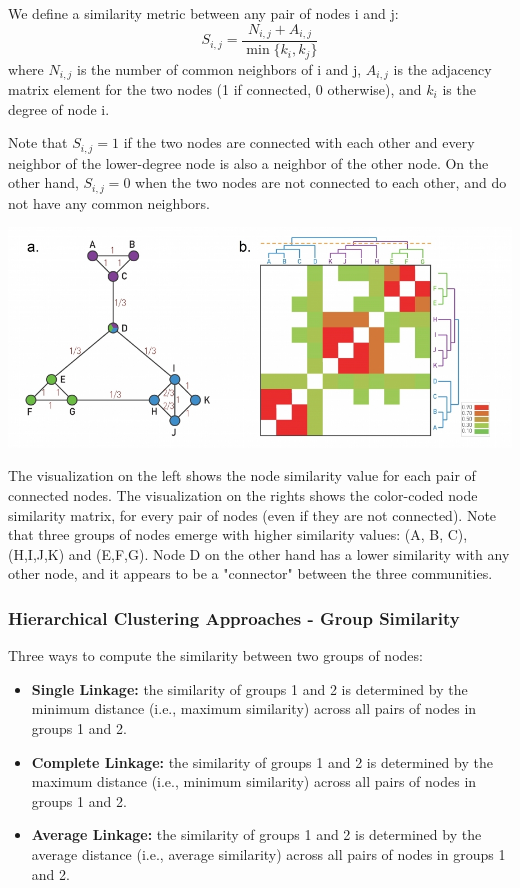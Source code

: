 \documentclass[11pt]{scrartcl} %
\begin{document}
We define a similarity metric between any pair of nodes i and j:
\[ S_{i,j} = \frac{N_{i,j} + A_{i,j}}{\min\{k_i, k_j\}} \]
where $N_{i,j}$ is the number of common neighbors of i and j, $A_{i,j}$ is the adjacency matrix element for the two nodes (1 if connected, 0 otherwise), and $k_i$ is the degree of node i.

Note that $S_{i,j} = 1$ if the two nodes are connected with each other and every neighbor of the lower-degree node is also a neighbor of the other node.  On the other hand, $S_{i,j} = 0$ when the two nodes are not connected to each other, and do not have any common neighbors.

\includegraphics[width=0.9\linewidth]{img/L7.2-AgglomerativeHierarchicalCommunityDetection.jpg}

The visualization on the left shows the node similarity value for each pair of connected nodes. The visualization on the rights shows the color-coded node similarity matrix, for every pair of nodes (even if they are not connected). Note that three groups of nodes emerge with higher similarity values: (A, B, C), (H,I,J,K) and (E,F,G). Node D on the other hand has a lower similarity with any other node, and it appears to be a "connector" between the three communities.

\subsubsection{Hierarchical Clustering Approaches - Group Similarity}
Three ways to compute the similarity between two groups of nodes:
\begin{itemize}
	\item \textbf{Single Linkage:} the similarity of groups 1 and 2 is determined by the minimum distance (i.e., maximum similarity) across all pairs of nodes in groups 1 and 2.  
	\item \textbf{Complete Linkage:} the similarity of groups 1 and 2 is determined by the maximum distance (i.e., minimum similarity) across all pairs of nodes in groups 1 and 2. 
	\item \textbf{Average Linkage:} the similarity of groups 1 and 2 is determined by the average distance (i.e., average similarity) across all pairs of nodes in groups 1 and 2.
\end{itemize}
\end{document}
